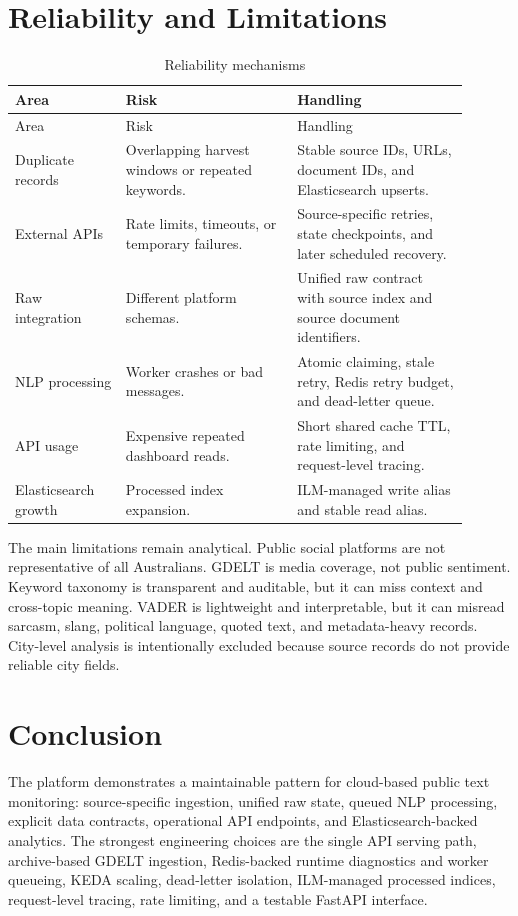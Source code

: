\documentclass[11pt,a4paper]{article}
\begin{document}
\section{Reliability and Limitations}

\begin{longtable}{p{0.22\linewidth}p{0.34\linewidth}p{0.34\linewidth}}
\caption{Reliability mechanisms}\\
\toprule
Area & Risk & Handling \\
\midrule
\endfirsthead
\toprule
Area & Risk & Handling \\
\midrule
\endhead
Duplicate records & Overlapping harvest windows or repeated keywords. & Stable source IDs, URLs, document IDs, and Elasticsearch upserts. \\
External APIs & Rate limits, timeouts, or temporary failures. & Source-specific retries, state checkpoints, and later scheduled recovery. \\
Raw integration & Different platform schemas. & Unified raw contract with source index and source document identifiers. \\
NLP processing & Worker crashes or bad messages. & Atomic claiming, stale retry, Redis retry budget, and dead-letter queue. \\
API usage & Expensive repeated dashboard reads. & Short shared cache TTL, rate limiting, and request-level tracing. \\
Elasticsearch growth & Processed index expansion. & ILM-managed write alias and stable read alias. \\
\bottomrule
\end{longtable}

The main limitations remain analytical. Public social platforms are not representative of all Australians. GDELT is media coverage, not public sentiment. Keyword taxonomy is transparent and auditable, but it can miss context and cross-topic meaning. VADER is lightweight and interpretable, but it can misread sarcasm, slang, political language, quoted text, and metadata-heavy records. City-level analysis is intentionally excluded because source records do not provide reliable city fields.

\section{Conclusion}

The platform demonstrates a maintainable pattern for cloud-based public text monitoring: source-specific ingestion, unified raw state, queued NLP processing, explicit data contracts, operational API endpoints, and Elasticsearch-backed analytics. The strongest engineering choices are the single API serving path, archive-based GDELT ingestion, Redis-backed runtime diagnostics and worker queueing, KEDA scaling, dead-letter isolation, ILM-managed processed indices, request-level tracing, rate limiting, and a testable FastAPI interface.
\end{document}
